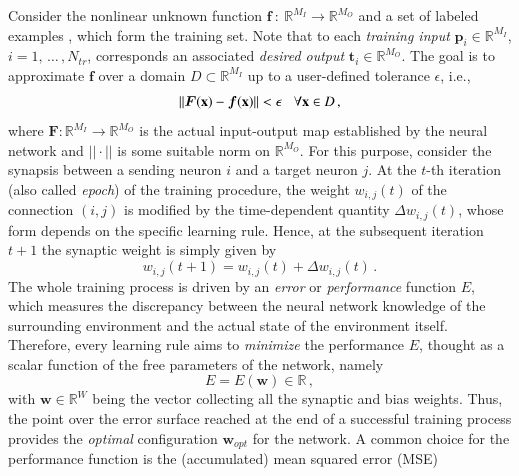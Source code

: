 \documentclass[longtitle]{elsarticle}
\numberwithin{equation}{section}
\theoremstyle{theorem}
\theoremstyle{definition}
\theoremstyle{remark}
\theoremstyle{proposition}
\numberwithin{figure}{section}
\newcommand{\bg}[1]{\boldsymbol{#1}}
\begin{document}
		Consider the nonlinear unknown function $\bg{f} ~ : ~ \mathbb{R}^{M_I} \rightarrow \mathbb{R}^{M_O}$ and a set of labeled examples \smash{$\big\lbrace \mathbf{p}_i, \mathbf{t}_i = \bg{f}(\mathbf{p}_i)\big\rbrace_{1 \leq i \leq N_{tr}}$}, which form the training set. Note that to each \emph{training input} $\mathbf{p}_i \in \mathbb{R}^{M_I}$, $i = 1, \, \ldots \, , N_{tr}$, corresponds an associated \emph{desired output} $\mathbf{t}_i \in \mathbb{R}^{M_O}$. The goal is to approximate $\bg{f}$ over a domain $D \subset \mathbb{R}^{M_I}$ up to a user-defined tolerance $\epsilon$, i.e.,
		\begin{equation*}
			||\bg{F}(\mathbf{x}) - \boldsymbol{f}(\mathbf{x})|| < \epsilon \hspace*{0.3cm} \text{$\forall \mathbf{x} \in D$} \, ,
		\end{equation*}
		where $\bg{F} : \mathbb{R}^{M_I} \rightarrow \mathbb{R}^{M_O}$ is the actual input-output map established by the neural network and $||\cdot||$ is some suitable norm on $\mathbb{R}^{M_O}$. For this purpose, consider the synapsis between a sending neuron $i$ and a target neuron $j$. At the $t$-th iteration (also called \emph{epoch}) of the training procedure, the weight $w_{i,j}(t)$ of the connection $(i,j)$ is modified by the time-dependent quantity $\Delta w_{i,j}(t)$, whose form depends on the specific learning rule. Hence, at the subsequent iteration $t+1$ the synaptic weight is simply given by
		\begin{equation*}
			w_{i,j}(t+1) = w_{i,j}(t) + \Delta w_{i,j}(t) \, .
		\end{equation*}
		The whole training process is driven by an \emph{error} or \emph{performance} function $E$, which measures the discrepancy between the neural network knowledge of the surrounding environment and the actual state of the environment itself. Therefore, every learning rule aims to \emph{minimize} the performance $E$, thought as a scalar function of the free parameters of the network, namely 
		\begin{equation*}
			E = E(\mathbf{w}) \in \mathbb{R} \, , 
		\end{equation*}
		with $\mathbf{w} \in \mathbb{R}^{W}$ being the vector collecting all the synaptic and bias weights. Thus, the point over the error surface reached at the end of a successful training process provides the \emph{optimal} configuration $\mathbf{w}_{opt}$ for the network. A common choice for the performance function is the (accumulated) mean squared error (MSE)
\end{document}
